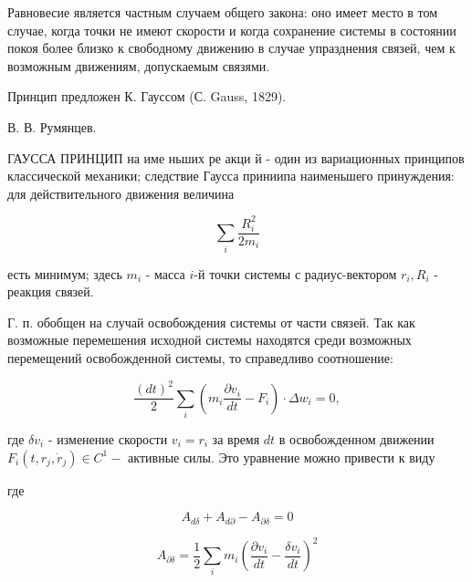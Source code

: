 \documentclass[10pt]{article}
\begin{document}
Равновесие является частным случаем общего закона: оно имеет место в том случае, когда точки не имеют скорости и когда сохранение системы в состоянии покоя более близко к свободному движению в случае упразднения связей, чем к возможным движениям, допускаемым связями.



Принцип предложен К. Гауссом (С. Gauss, 1829).



В. В. Румянцев.



ГАУССА ПРИНЦИП на име ньших ре акци й - один из вариационных принципов классической механики; следствие Гаусса приниипа наименьшего принуждения: для действительного движения величина



\[

\sum_{i} \frac{R_{i}^{2}}{2 m_{i}}

\]



есть минимум; здесь $m_{i}$ - масса $i$-й точки системы с радиус-вектором $r_{i}, R_{i}$ - реакция связей.



Г. п. обобщен на случай освобождения системы от части связей. Так как возможные перемешения исходной системы находятся среди возможных перемещений освобожденной системы, то справедливо соотношение:



\[

\frac{(d t)^{2}}{2} \sum_{i}\left(m_{i} \frac{\partial v_{i}}{d t}-F_{i}\right) \cdot \Delta w_{i}=0,

\]



где $\delta v_{i}$ - изменение скорости $v_{i}=r_{i}$ за время $d t$ в освобожденном движении $F_{i}\left(t, r_{j}, \dot{r}_{j}\right) \in C^{1}-$ активные силы. Это уравнение можно привести к виду



где



\[

A_{d \delta}+A_{d \partial}-A_{\partial \delta}=0

\]



\[

A_{\partial \delta}=\frac{1}{2} \sum_{i} m_{i}\left(\frac{\partial v_{i}}{d t}-\frac{\delta v_{i}}{d t}\right)^{2}

\]
\end{document}
